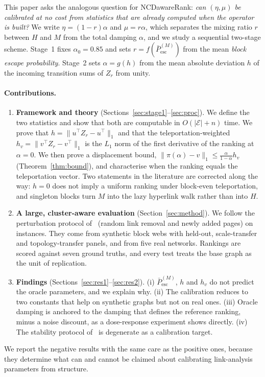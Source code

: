 \documentclass[11pt,a4paper]{article}
\theoremstyle{definition}
\theoremstyle{remark}
\newcommand{\Pbar}{\bar P^{(M)}_{\mathrm{esc}}}
\begin{document}
This paper asks the analogous question for NCDawareRank: \emph{can $(\eta,\mu)$ be calibrated at no cost
from statistics that are already computed when the operator is built?} We write $\eta=(1-r)\alpha$ and
$\mu=r\alpha$, which separates the mixing ratio $r$ between $H$ and $M$ from the total damping $\alpha$,
and we study a sequential two-stage scheme. Stage~1 fixes $\alpha_0=0.85$ and sets
$r=f(\Pbar)$ from the mean \emph{block escape probability}. Stage~2 sets $\alpha=g(h)$ from the mean
absolute deviation $h$ of the incoming transition sums of $Z_r$ from unity.

\paragraph{Contributions.}
\begin{enumerate}[leftmargin=1.4em,itemsep=2pt]
\item \textbf{Framework and theory} (Sections~\ref{sec:stage1}--\ref{sec:proc}). We define the two
statistics and show that both are computable in $O(|\mathcal E|+n)$ time. We prove that
$h=\|u^\top Z_r-u^\top\|_1$ and that the teleportation-weighted $h_v=\|v^\top Z_r-v^\top\|_1$ is the
$L_1$ norm of the first derivative of the ranking at $\alpha=0$. We then prove a displacement bound,
$\|\pi(\alpha)-v\|_1\le\frac{\alpha}{1-\alpha}h_v$ (Theorem~\ref{thm:bound}), and characterise when the
ranking equals the teleportation vector. Two statements in the literature are corrected along the way:
$h=0$ does not imply a uniform ranking under block-even teleportation, and singleton blocks turn $M$
into the lazy hyperlink walk rather than into $H$.
\item \textbf{A large, cluster-aware evaluation} (Section~\ref{sec:method}). We follow the perturbation
protocol of~\cite{ng13} (random link removal and newly added pages) on \nInstTotal{} instances. They
come from synthetic block webs with held-out, scale-transfer and topology-transfer panels, and from five
real networks. Rankings are scored against seven ground truths, and every test treats the base graph as
the unit of replication.
\item \textbf{Findings} (Sections~\ref{sec:res1}--\ref{sec:res2}). (i) $\Pbar$, $h$ and $h_v$ do not
predict the oracle parameters, and we explain why. (ii) The calibration reduces to two constants that
help on synthetic graphs but not on real ones. (iii) Oracle damping is anchored to the damping that
defines the reference ranking, minus a noise discount, as a dose-response experiment shows directly.
(iv) The stability protocol of~\cite{ng13} is degenerate as a calibration target.
\end{enumerate}
We report the negative results with the same care as the positive ones, because they determine what can
and cannot be claimed about calibrating link-analysis parameters from structure.
\end{document}
